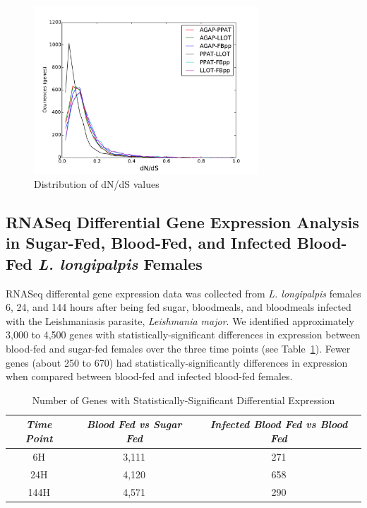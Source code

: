 \begin{figure}[H]
  \centering
  \includegraphics[width=0.75\textwidth]{figures/ka_ks/dN_dS}
  \caption{Distribution of dN/dS values}
  \label{fig:dnds-distr}
\end{figure}

\subsection{RNASeq Differential Gene Expression Analysis in Sugar-Fed, Blood-Fed, and Infected Blood-Fed \emph{L. longipalpis} Females}
RNASeq differental gene expression data was collected from \emph{L. longipalpis} females 6, 24, and 144 hours after being fed sugar, bloodmeals, and bloodmeals infected with the Leishmaniasis parasite, \emph{Leishmania major}.  We identified approximately 3,000 to 4,500 genes with statistically-significant differences in expression between blood-fed and sugar-fed females over the three time points (see Table~\ref{tab:stat-sig-genes}).  Fewer genes (about 250 to 670) had statistically-significantly differences in expression when compared between blood-fed and infected blood-fed females.

\begin{table}[H]
  \centering
  \begin{tabular}{c c c} \hline
  \emph{Time Point} & \emph{Blood Fed vs Sugar Fed} & \emph{Infected Blood Fed vs Blood Fed} \\ \hline
  6H & 3,111 & 271 \\
  24H & 4,120 & 658 \\
  144H & 4,571 & 290 \\
  \end{tabular}
  \caption{Number of Genes with Statistically-Significant Differential Expression}
  \label{tab:stat-sig-genes}
\end{table}

